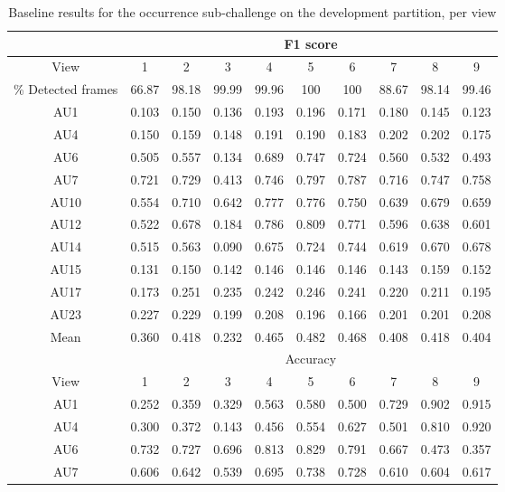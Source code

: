 \documentclass[a4paper, 10pt, conference]{ieeeconf}      \usepackage{FG2017}
\begin{document}
\begin{table*}[t]
\begin{center}
\caption{Baseline results for the occurrence sub-challenge on the development partition, per view}
\vspace{2mm}
\label{t:baseline_occurrence_per_view}
\begin{tabular}{c|c|c|c|c|c|c|c|c|c|}
\hhline{----------} 
& \multicolumn{9}{c|}{F1 score} \\
\hline
View & 1 & 2 & 3 & 4 & 5 & 6 & 7 & 8 & 9 \\
\hline
\% Detected frames & 66.87 &  98.18 & 99.99 & 99.96 & 100 & 100 & 88.67 & 98.14 & 99.46 \\
\hline
AU1 & 0.103 & 0.150 & 0.136 & 0.193 & 0.196 & 0.171 & 0.180 & 0.145 & 0.123 \\ 
AU4 & 0.150 & 0.159 & 0.148 & 0.191 & 0.190 & 0.183 & 0.202 & 0.202 & 0.175 \\ 
AU6 & 0.505 & 0.557 & 0.134 & 0.689 & 0.747 & 0.724 & 0.560 & 0.532 & 0.493 \\ 
AU7 & 0.721 & 0.729 & 0.413 & 0.746 & 0.797 & 0.787 & 0.716 & 0.747 & 0.758 \\ 
AU10 & 0.554 & 0.710 & 0.642 & 0.777 & 0.776 & 0.750 & 0.639 & 0.679 & 0.659 \\ 
AU12 & 0.522 & 0.678 & 0.184 & 0.786 & 0.809 & 0.771 & 0.596 & 0.638 & 0.601 \\ 
AU14 & 0.515 & 0.563 & 0.090 & 0.675 & 0.724 & 0.744 & 0.619 & 0.670 & 0.678 \\ 
AU15 & 0.131 & 0.150 & 0.142 & 0.146 & 0.146 & 0.146 & 0.143 & 0.159 & 0.152 \\ 
AU17 & 0.173 & 0.251 & 0.235 & 0.242 & 0.246 & 0.241 & 0.220 & 0.211 & 0.195 \\ 
AU23 & 0.227 & 0.229 & 0.199 & 0.208 & 0.196 & 0.166 & 0.201 & 0.201 & 0.208 \\ 
\hline
Mean & 0.360 & 0.418 & 0.232 & 0.465 & 0.482 & 0.468 & 0.408 & 0.418 & 0.404 
 \\ \hline
& \multicolumn{9}{c|}{Accuracy} \\
\hline
View & 1 & 2 & 3 & 4 & 5 & 6 & 7 & 8 & 9 \\
\hline
AU1 & 0.252 & 0.359 & 0.329 & 0.563 & 0.580 & 0.500 & 0.729 & 0.902 & 0.915 \\ 
AU4 & 0.300 & 0.372 & 0.143 & 0.456 & 0.554 & 0.627 & 0.501 & 0.810 & 0.920 \\ 
AU6 & 0.732 & 0.727 & 0.696 & 0.813 & 0.829 & 0.791 & 0.667 & 0.473 & 0.357 \\ 
AU7 & 0.606 & 0.642 & 0.539 & 0.695 & 0.738 & 0.728 & 0.610 & 0.604 & 0.617 \\ 

\end{tabular}
\end{center}
\end{table*}
\end{document}
